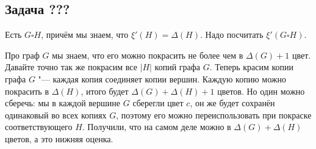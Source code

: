 \subsection{Задача ???}
	Есть $G \square H$, причём мы знаем, что $\xi'(H) = \Delta(H)$.
	Надо посчитать $\xi'(G \square H)$.

	Про граф $G$ мы знаем, что его можно покрасить не более чем в $\Delta(G) +1$ цвет.
	Давайте точно так же покрасим все $|H|$ копий графа $G$.
	Теперь красим копии графа $G$ "--- каждая копия соединяет копии вершин.
	Каждую копию можно покрасить в $\Delta(H)$, итого будет $\Delta(G)+\Delta(H)+1$ цветов.
	Но один можно сберечь: мы в каждой вершине $G$ сберегли цвет $c$, он же будет сохранён одинаковый
	во всех копиях $G$, поэтому его можно переиспользовать при покраске соответствующего $H$.
	Получили, что на самом деле можно в $\Delta(G)+\Delta(H)$ цветов, а это нижняя оценка.
